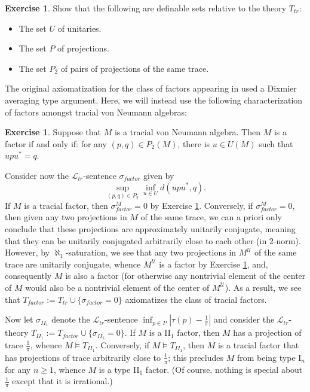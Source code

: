 \documentclass[12pt]{amsart}
\theoremstyle{definition}
\newtheorem{ex}[thm]{Exercise}
\def\cal{\mathcal}
\def\u{\mathsf 1}
\newcommand\cL{{\cal L}}
\def \u{\mathcal U}
\begin{document}
\begin{ex}
Show that the following are definable sets relative to the theory $T_{tr}$:
\begin{itemize}
    \item The set $U$ of unitaries.
    \item The set $P$ of projections.
    \item The set $P_2$ of pairs of projections of the same trace.
\end{itemize}
\end{ex}

The original axiomatization for the class of factors appearing in \cite[Proposition 3.4(1)]{mtoa2} used a Dixmier averaging type argument.  Here, we will instead use the following characterization of factors amongst tracial von Neumann algebras:

\begin{ex}\label{factorex}
Suppose that $M$ is a tracial von Neumann algebra.  Then $M$ is a factor if and only if:  for any $(p,q)\in P_2(M)$, there is $u\in U(M)$ such that $upu^*=q$.
\end{ex}

Consider now the $\cL_{tr}$-sentence $\sigma_{factor}$ given by
$$\sup_{(p,q)\in P_2}\inf_{u\in U}d(upu^*,q).$$  If $M$ is a tracial factor, then $\sigma_{factor}^M=0$ by Exercise \ref{factorex}.  Conversely, if $\sigma_{factor}^M=0$, then given any two projections in $M$ of the same trace, we can a priori only conclude that these projections are approximately unitarily conjugate, meaning that they can be unitarily conjugated arbitrarily close to each other (in 2-norm).  However, by $\aleph_1$-saturation, we see that any two projections in $M^\u$ of the same trace are unitarily conjugate, whence $M^\u$ is a factor by Exercise \ref{factorex}, and, consequently $M$ is also a factor (for otherwise any nontrivial element of the center of $M$ would also be a nontrivial element of the center of $M^\u$).  As a result, we see that $T_{factor}:=T_{tr}\cup\{\sigma_{factor}=0\}$ axiomatizes the class of tracial factors.

Now let $\sigma_{II_1}$ denote the $\cL_{tr}$-sentence $\inf_{p\in P}|\tau(p)-\frac{1}{\pi}|$ and consider the $\cL_{tr}$-theory $T_{II_1}:=T_{factor}\cup\{\sigma_{II_1}=0\}$.  If $M$ is a II$_1$ factor, then $M$ has a projection of trace $\frac{1}{\pi}$, whence $M\models T_{II_1}$.  Conversely, if $M\models T_{II_1}$, then $M$ is a tracial factor that has projections of trace arbitrarily close to $\frac{1}{\pi}$; this precludes $M$ from being type I$_n$ for any $n\geq 1$, whence $M$ is a type II$_1$ factor.  (Of course, nothing is special about $\frac{1}{\pi}$ except that it is irrational.)
\end{document}
